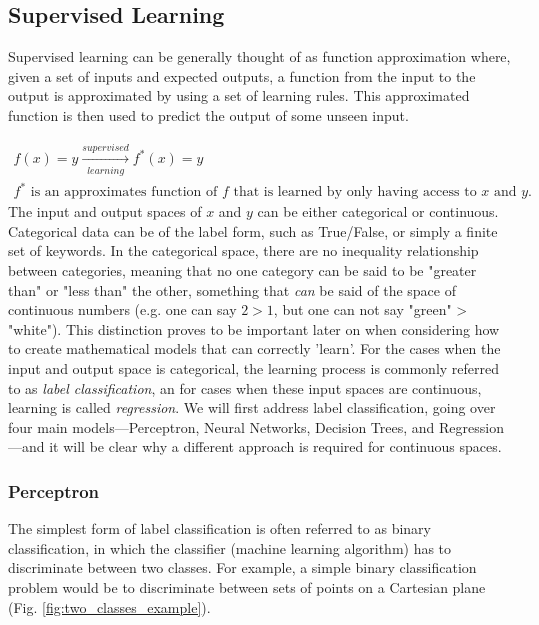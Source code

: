 
\subsection{Supervised Learning}
\label{sec:supervised_learning}

Supervised learning can be generally thought of as function approximation where, given a set of inputs and expected outputs, a function from the input to the output is approximated by using a set of learning rules. This approximated function is then used to predict the output of some unseen input.


\begin{gather*}
  f(x) = y \xrightarrow[learning]{supervised} f^*(x)=y \\
  \text{$f^*$ is an approximates function of $f$ that is learned by only having access to $x$ and $y$.}
\end{gather*}
The input and output spaces of $x$ and $y$ can be either categorical or continuous. Categorical data can be of the label form, such as True/False, or simply a finite set of keywords. In the categorical space, there are no inequality relationship between categories, meaning that no one category can be said to be "greater than" or "less than" the other, something that \textit{can} be said of the space of continuous numbers (e.g. one can say $2>1$, but one can not say "green" > "white"). This distinction proves to be important later on when considering how to create mathematical models that can correctly 'learn'. For the cases when the input and output space is categorical, the learning process is commonly referred to as \textit{label classification}, an for cases when these input spaces are continuous, learning is called \textit{regression}. We will first address label classification, going over four main models---Perceptron, Neural Networks, Decision Trees, and Regression---and it will be clear why a different approach is required for continuous spaces.

\subsubsection{Perceptron}
\label{sec:perceptron}
The simplest form of label classification is often referred to as binary classification, in which the classifier (machine learning algorithm) has to discriminate between two classes. For example, a simple binary classification problem would be to discriminate between sets of points on a Cartesian plane (Fig. \ref{fig:two_classes_example}).

